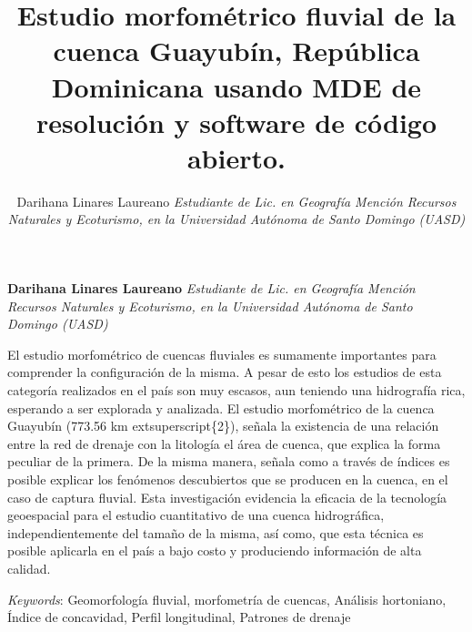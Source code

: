 \documentclass[11pt,]{article}
\title{\textbar{}Estudio morfométrico fluvial de la cuenca Guayubín, República
Dominicana usando MDE de resolución y software de código abierto.  }
\author{\Large Darihana Linares Laureano\vspace{0.05in} \newline\normalsize\emph{Estudiante de Lic. en Geografía Mención Recursos Naturales y Ecoturismo,
en la Universidad Autónoma de Santo Domingo (UASD)}  }
\date{}
\newcommand*{\authorfont}{\fontfamily{phv}\selectfont}
\renewenvironment{abstract}
 {{%
    \setlength{\leftmargin}{0mm}
    \setlength{\rightmargin}{\leftmargin}%
  }%
  \relax}
 {\endlist}
\begin{document}
	
%

{%
\setlength{\parindent}{0pt}
\thispagestyle{plain}
{\fontsize{18}{20}\selectfont\raggedright 
\maketitle  %

}

{
   \vskip 13.5pt\relax \normalsize\fontsize{11}{12} 
\textbf{\authorfont Darihana Linares Laureano} \hskip 15pt \emph{\small Estudiante de Lic. en Geografía Mención Recursos Naturales y Ecoturismo,
en la Universidad Autónoma de Santo Domingo (UASD)}   

}

}








\begin{abstract}

    \hbox{\vrule height .2pt width 39.14pc}

    \vskip 8.5pt %

\noindent El estudio morfométrico de cuencas fluviales es sumamente importantes
para comprender la configuración de la misma. A pesar de esto los
estudios de esta categoría realizados en el país son muy escasos, aun
teniendo una hidrografía rica, esperando a ser explorada y analizada. El
estudio morfométrico de la cuenca Guayubín (773.56 km
extsuperscript\{2\}), señala la existencia de una relación entre la red
de drenaje con la litología el área de cuenca, que explica la forma
peculiar de la primera. De la misma manera, señala como a través de
índices es posible explicar los fenómenos descubiertos que se producen
en la cuenca, en el caso de captura fluvial. Esta investigación
evidencia la eficacia de la tecnología geoespacial para el estudio
cuantitativo de una cuenca hidrográfica, independientemente del tamaño
de la misma, así como, que esta técnica es posible aplicarla en el país
a bajo costo y produciendo información de alta calidad.


\vskip 8.5pt \noindent \emph{Keywords}: Geomorfología fluvial, morfometría de cuencas, Análisis hortoniano,
Índice de concavidad, Perfil longitudinal, Patrones de drenaje \par

    \hbox{\vrule height .2pt width 39.14pc}



\end{abstract}
\end{document}
